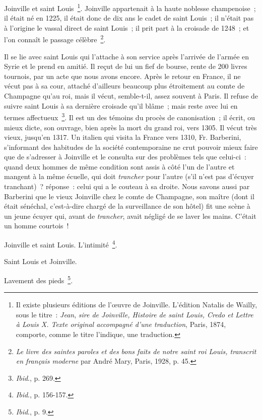 \documentclass[french,twoside]{book} %
\begin{document}
\noindent Joinville et saint Louis \footnote{ Il existe plusieurs éditions de l’œuvre de Joinville. L’édition Natalis de Wailly, sous le titre : {\itshape Jean}, {\itshape sire de Joinville, Histoire de saint Louis, Credo et Lettre à Louis X. Texte original accompagné d’une traduction}, Paris, 1874, comporte, comme le titre l’indique, une traduction.}. Joinville appartenait à la haute noblesse champenoise ; il était né en 1225, il était donc de dix ans  
\label{p5} le cadet de saint Louis ; il n’était pas à l’origine le vassal direct de saint Louis ; il prit part à la croisade de 1248 ; et l’on connaît le passage célèbre \footnote{{\itshape Le livre des saintes paroles et des bons faits de notre saint roi Louis, transcrit en français moderne} par André Mary, Paris, 1928, p. 45.}.\par
Il se lie avec saint Louis qui l’attache à son service après l’arrivée de l’armée en Syrie et le prend en amitié. Il reçut de lui un fief de bourse, rente de 200 livres tournois, par un acte que nous avons encore. Après le retour en France, il ne vécut pas à sa cour, attaché d’ailleurs beaucoup plus étroitement au comte de Champagne qu’au roi, mais il vécut, semble-t-il, assez souvent à Paris. Il refuse de suivre saint Louis à sa dernière croisade qu’il blâme ; mais reste avec lui en termes affectueux \footnote{{\itshape Ibid}., p. 269.}. Il est un des témoins du procès de canonisation ; il écrit, ou mieux dicte, son ouvrage, bien après la mort du grand roi, vers 1305. Il vécut très vieux, jusqu’en 1317. Un italien qui visita la France vers 1310, Fr. Barberini, s’informant des habitudes de la société contemporaine ne crut pouvoir mieux faire que de s’adresser à Joinville et le consulta sur des problèmes tels que celui-ci : quand deux hommes de même condition sont assis à côté l’un de l’autre et mangent à la même écuelle, qui doit {\itshape trancher} pour l’autre (s’il n’est pas d’écuyer tranchant) ? réponse : celui qui a le couteau à sa droite. Nous savons aussi par Barberini que le vieux Joinville chez le comte de Champagne, son maître (dont il était sénéchal, c’est-à-dire chargé de la surveillance de son hôtel) fit une scène à un jeune écuyer qui, avant de \emph{trancher}, avait négligé de se laver les mains. C’était un homme courtois ! \par
Joinville et saint Louis. L’intimité \footnote{{\itshape Ibid}., p. 156-157. }.\par
Saint Louis et Joinville.\par
Lavement des pieds \footnote{{\itshape Ibid}., p. 9.}.\par
\end{document}
